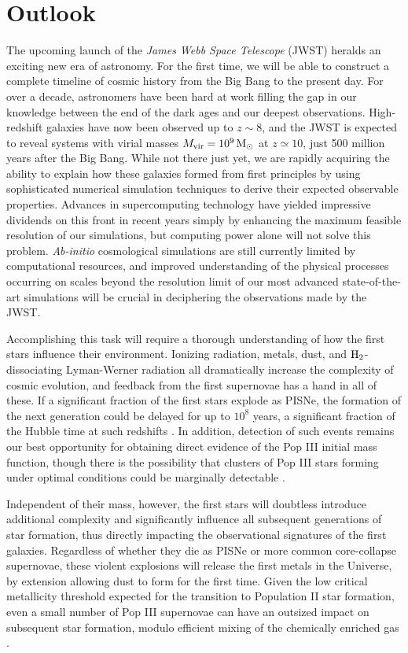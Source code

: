 \documentclass[../thesis.tex]{subfiles}
\begin{document}
\chapter{Outlook}
The upcoming launch of the \textit{James Webb Space Telescope} (JWST) heralds an exciting new era of astronomy. 
For the first time, we will be able to construct a complete timeline of cosmic history from the Big Bang to the present day.
For over a decade, astronomers have been hard at work filling the gap in our knowledge between the end of the dark ages and our deepest observations.
High-redshift galaxies have now been observed up to $z\sim8$, and the JWST is expected to reveal systems with virial masses $M_{\mathrm{vir}} = 10^9\,\mathrm{M}_{\odot}$ at $z\simeq10$, just 500 million years after the Big Bang.
While not there just yet, we are rapidly acquiring the ability to explain how these galaxies formed from first principles by using sophisticated numerical simulation techniques to derive their expected observable properties.
Advances in supercomputing technology have yielded impressive dividends on this front in recent years simply by enhancing the maximum feasible resolution of our simulations, but computing power alone will not solve this problem.
\textit{Ab-initio} cosmological simulations are still currently limited by computational resources, and improved understanding of the physical processes occurring on scales beyond the resolution limit of our most advanced state-of-the-art simulations will be crucial in deciphering the observations made by the JWST.

Accomplishing this task will require a thorough understanding of how the first stars influence their environment.
Ionizing radiation, metals, dust, and $\mathrm{H}_2$-dissociating Lyman-Werner radiation all dramatically increase the complexity of cosmic evolution, and feedback from the first supernovae has a hand in all of these.
If a significant fraction of the first stars explode as PISNe, the formation of the next generation could be delayed for up to $10^8$ years, a significant fraction of the Hubble time at such redshifts \citep{JohnsonGreifBromm2007, Yoshidaetal2007, Jeonetal2014b}.
In addition, detection of such events remains our best opportunity for obtaining direct evidence of the Pop III initial mass function, though there is the possibility that clusters of Pop III stars forming under optimal conditions could be marginally detectable \citep{Safranek-Shraderetal2012}.

Independent of their mass, however, the first stars will doubtless introduce additional complexity and significantly influence all subsequent generations of star formation, thus directly impacting the observational signatures of the first galaxies.
Regardless of whether they die as PISNe or more common core-collapse supernovae, these violent explosions will release the first metals in the Universe, by extension allowing dust to form for the first time.  
Given the low critical metallicity threshold expected for the transition to Population II star formation, even a small number of Pop III supernovae can have an outsized impact on subsequent star formation, modulo efficient mixing of the chemically enriched gas \citep{Ritteretal2012}.
\end{document}
